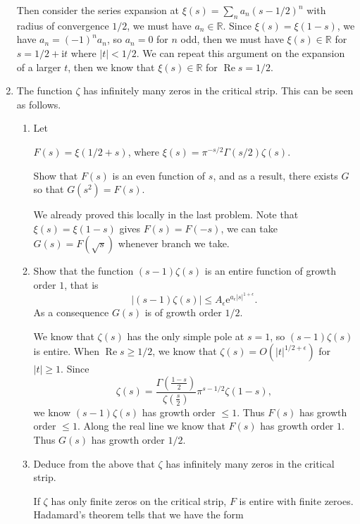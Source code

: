 \documentclass[11pt]{report}
\theoremstyle{mythm}
\let\oldendproof\endproof
\renewenvironment{proof}[1][\proofname]{%
  \oldproof[\normalfont \bfseries #1]%
}{\oldendproof}
\renewcommand*{\proofname}{Proof}
\theoremstyle{myans}
\newcommand{\mi}{\mathrm{i}}
\newcommand{\me}{\mathrm{e}}
\newcommand{\bbR}{\mathbb{R}}
\renewcommand{\Re}{\operatorname{Re}}
\begin{document}
\begin{enumerate}
\begin{proof}
    Then consider the series expansion at $\xi(s) = \sum_n a_n (s-1/2)^n$ with
    radius of convergence $1/2$, we must have $a_n\in\bbR$.
    Since $\xi(s) = \xi(1-s)$, we have $a_n = (-1)^n a_n$, so $a_n = 0$ for $n$ odd, then we must
    have $\xi(s) \in \bbR$ for $s = 1/2 + \mi t$ where $|t| < 1/2$. We can repeat this argument
    on the expansion of a larger $t$, then we know that $\xi(s) \in \bbR$ for $\Re s = 1/2$.
  \end{proof}
  \item The function $\zeta$ has infinitely many zeros in the critical strip. This can be seen as follows.
  \begin{enumerate}
    \item Let
    \begin{center}
      $F(s) = \xi(1/2 + s)$, \quad where \quad $\xi(s) = \pi^{-s/2}\Gamma(s/2)\zeta(s)$.
    \end{center}
    Show that $F(s)$ is an even function of $s$, and as a result, there exists $G$ so
    that $G(s^2) = F(s)$.
    \begin{proof}
      We already proved this locally in the last problem. Note that $\xi(s)=\xi(1-s)$ gives $F(s) = F(-s)$, we can take
      $G(s) = F(\sqrt s)$ whenever branch we take.
    \end{proof}
    \item Show that the function $(s - 1)\zeta(s)$ is an entire function of growth order $1$,
    that is
    \[ |(s-1) \zeta(s)| \leq A_\epsilon \me^{a_\epsilon |s|^{1+\epsilon}}. \]
    As a consequence $G(s)$ is of growth order $1/2$.
    \begin{proof}
      We know that $\zeta(s)$ has the only simple pole at $s=1$, so $(s-1)\zeta(s)$ is entire.
      When $\Re s \geq 1/2$, we know that $\zeta(s) = O(|t|^{1/2 + \epsilon})$ for $|t|\geq 1$.
      Since
      \[ \zeta(s) = \frac{\Gamma\left(\frac{1-s}{2}\right)}{\zeta\left(\frac s 2\right)}
      \pi^{s-1/2} \zeta(1-s), \]
      we know $(s-1)\zeta(s)$ has growth order $\leq 1$. Thus $F(s)$ has growth order $\leq 1$.
      Along the real line we know that $F(s)$ has growth order $1$. Thus $G(s)$ has growth order $1/2$.
    \end{proof}
    \item Deduce from the above that $\zeta$ has infinitely many zeros in the critical strip.
    \begin{proof}
      If $\zeta$ has only finite zeros on the critical strip, $F$ is entire with finite zeroes.
      Hadamard's theorem tells that we have the form

\end{proof}
\end{enumerate}
\end{enumerate}
\end{document}
